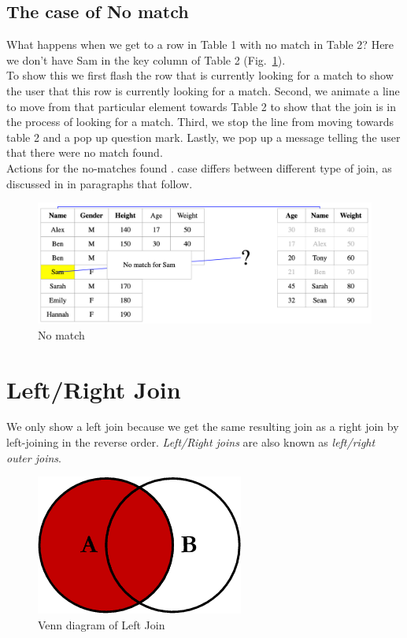 \subsection{The case of No match}
What happens when we get to a row in Table 1 with no match in Table 2? Here we don’t have Sam in the key column of Table 2 (Fig.~\ref{fig:nomatch1}). \\

To show this we first flash the row that is currently looking for a match to show the user that this row is currently looking for a match. 
Second, we animate a line to move from that particular element towards Table 2 to show that the join is in the process of looking for a match. 
Third, we stop the line from moving towards table 2 and a pop up question mark. 
Lastly, we pop up a message telling the user that there were no match found. \\

Actions for the no-matches found . case differs between different type of join, as discussed in in paragraphs that follow.

\begin{figure}[H]
    \includegraphics[scale = 0.25]{Masters-Thesis/img/nomatch1.png}
    \caption{No match}
    \label{fig:nomatch1}
\end{figure}

\section{Left/Right Join}
We only show a left join because we get the same resulting join as a right join by left-joining in the reverse order. \textit{Left/Right joins} are also known as \textit{left/right outer joins}.

\begin{figure}[H]
    \centering
    \includegraphics[scale = 0.5]{Masters-Thesis/img/vennleft.png}
    \caption{Venn diagram of Left Join}
    \label{fig:vennleft}
\end{figure}

